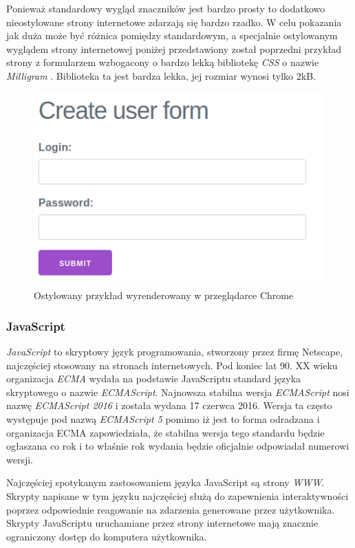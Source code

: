 \documentclass[polish, twoside, 12pt]{mwart}
\begin{document}
Ponieważ standardowy wygląd znaczników jest bardzo prosty to dodatkowo nieostylowane strony internetowe zdarzają się bardzo rzadko. W celu pokazania jak duża może być różnica pomiędzy standardowym, a specjalnie ostylowanym wyglądem strony internetowej poniżej przedstawiony został poprzedni przykład strony z formularzem wzbogacony o bardzo lekką bibliotekę \emph{CSS} o nazwie \emph{Milligram} \cite{milligram}. Biblioteka ta jest bardza lekka, jej rozmiar wynosi tylko 2kB.

\begin{figure}[ht]
  \includegraphics[width=\textwidth]{html-css-chrome.png}
	\caption{Ostylowany przykład wyrenderowany w przeglądarce Chrome}
\end{figure}

\subsubsection{JavaScript}

\emph{JavaScript} to skryptowy język programowania, stworzony przez firmę Netscape, najczęściej stosowany na stronach internetowych. Pod koniec lat 90. XX wieku organizacja \emph{ECMA} wydała na podstawie JavaScriptu standard języka skryptowego o nazwie \emph{ECMAScript}. Najnowsza stabilna wersja \emph{ECMAScript} nosi nazwę \emph{ECMAScript 2016} \cite{es2016} i została wydana 17 czerwca 2016. Wersja ta często występuje pod nazwą \emph{ECMAScript 5} pomimo iż jest to forma odradzana i organizacja ECMA zapowiedziała, że stabilna wersja tego standardu będzie ogłaszana co rok i to właśnie rok wydania będzie oficjalnie odpowiadał numerowi wersji. 

Najczęściej spotykanym zastosowaniem języka JavaScript są strony \emph{WWW}. Skrypty napisane w tym języku najczęściej służą do zapewnienia interaktywności poprzez odpowiednie reagowanie na zdarzenia generowane przez użytkownika. Skrypty JavaScriptu uruchamiane przez strony internetowe mają znacznie ograniczony dostęp do komputera użytkownika. 
\end{document}
